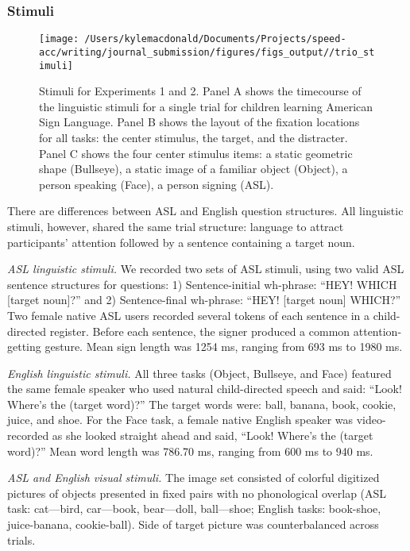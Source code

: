 \documentclass[,man,floatsintext]{apa6}
\begin{document}
\hypertarget{stimuli}{%
\subsubsection{Stimuli}\label{stimuli}}

\begin{figure}[!t]

{\centering \texttt{[image: /Users/kylemacdonald/Documents/Projects/speed-acc/writing/journal\_submission/figures/figs\_output//trio\_stimuli]} 

}

\caption{Stimuli for Experiments 1 and 2. Panel A shows the timecourse of the linguistic stimuli for a single trial for children learning American Sign Language. Panel B shows the layout of the fixation locations for all tasks: the center stimulus, the target, and the distracter. Panel C shows the four center stimulus items: a static geometric shape (Bullseye), a static image of a familiar object (Object), a person speaking (Face), a person signing (ASL).}\label{fig:trio-stim}
\end{figure}

There are differences between ASL and English question structures. All linguistic stimuli, however, shared the same trial structure: language to attract participants' attention followed by a sentence containing a target noun.

\emph{ASL linguistic stimuli.} We recorded two sets of ASL stimuli, using two valid ASL sentence structures for questions: 1) Sentence-initial wh-phrase: \enquote{HEY! WHICH {[}target noun{]}?} and 2) Sentence-final wh-phrase: \enquote{HEY! {[}target noun{]} WHICH?} Two female native ASL users recorded several tokens of each sentence in a child-directed register. Before each sentence, the signer produced a common attention-getting gesture. Mean sign length was 1254 ms, ranging from 693 ms to 1980 ms.

\emph{English linguistic stimuli.} All three tasks (Object, Bullseye, and Face) featured the same female speaker who used natural child-directed speech and said: \enquote{Look! Where's the (target word)?} The target words were: ball, banana, book, cookie, juice, and shoe. For the Face task, a female native English speaker was video-recorded as she looked straight ahead and said, \enquote{Look! Where's the (target word)?} Mean word length was 786.70 ms, ranging from 600 ms to 940 ms.

\emph{ASL and English visual stimuli.} The image set consisted of colorful digitized pictures of objects presented in fixed pairs with no phonological overlap (ASL task: cat---bird, car---book, bear---doll, ball---shoe; English tasks: book-shoe, juice-banana, cookie-ball). Side of target picture was counterbalanced across trials.
\end{document}
